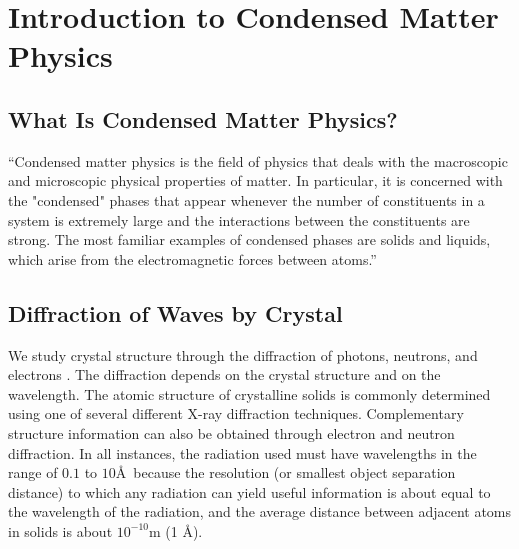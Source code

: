 \chapter{Introduction to Condensed Matter Physics}
\section{What Is Condensed Matter Physics?}

``Condensed matter physics is the field of physics that deals with the macroscopic and microscopic physical properties of matter. In particular, it is concerned with the "condensed" phases that appear whenever the number of constituents in a system is extremely large and the interactions between the constituents are strong. The most familiar examples of condensed phases are solids and liquids, which arise from the electromagnetic forces between atoms.''
\section{Diffraction of Waves by Crystal}
We study crystal structure through the diffraction of photons, neutrons, and electrons . The diffraction depends on the crystal structure and on the wavelength. The atomic structure of crystalline solids is commonly determined using one of several different X-ray diffraction techniques. Complementary structure information can also be obtained through electron and neutron diffraction. In all instances, the radiation used must have wavelengths in the range of $0.1$ to $10 $\AA  \ because the resolution (or smallest object separation distance) to which any radiation can yield useful information is about equal to the wavelength of the radiation, and the average distance between adjacent
atoms in solids is about $10^{ -10}  $m  (1 \AA).

